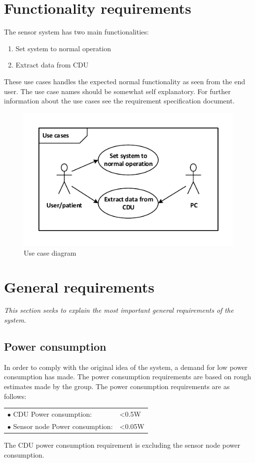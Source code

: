 \section{Functionality requirements}
The sensor system has two main functionalities:
\begin{enumerate}
	\item Set system to normal operation
	\item Extract data from CDU
\end{enumerate}
These use cases handles the expected normal functionality as seen from the end user. The use case names should be somewhat self explanatory. For further information about the use cases see the requirement specification document.
\begin{figure}[H]
	\centering
	\includegraphics[width=.7\textwidth]{billeder/7requirementspec/usecase_vector}
	\caption{Use case diagram}
\end{figure}


\section{General requirements}
\textit{This section seeks to explain the most important general requirements of the system}.
\subsection{Power consumption}
In order to comply with the original idea of the system, a demand for low power consumption has made. The power consumption requirements are based on rough estimates made by the group. The power consumption requirements are as follows:
\begin{table}[H]
	\begin{tabular}{p{8cm} p{2cm}}
	$\bullet$ CDU Power consumption: & <0.5W\\
	$\bullet$ Sensor node Power consumption: & <0.05W\\
	\end{tabular}
\end{table}
The CDU power consumption requirement is excluding the sensor node power consumption.
